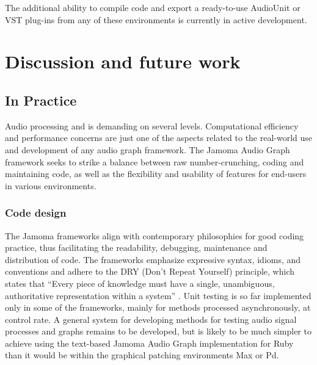 \documentclass[twoside,a4paper]{article}
\begin{document}
The additional ability to compile code and export a ready-to-use AudioUnit or VST plug-ins from any of these environments is currently in active development.





%
\section{Discussion and future work} %
%

\subsection{In Practice} %

Audio processing and is demanding on several levels.  Computational efficiency and performance concerns are just one of the aspects related to the real-world use and development of any audio graph framework.  The Jamoma Audio Graph framework seeks to strike a balance between raw number-crunching, coding and maintaining code, as well as the flexibility and usability of features for end-users in various environments.


\subsubsection{Code design} %

The Jamoma frameworks align with contemporary philosophies for good coding practice, thus facilitating the readability, debugging, maintenance and distribution of code.
The frameworks emphasize expressive syntax, idioms, and conventions \cite{Martin:2009} and adhere to the DRY (Don't Repeat Yourself) principle, which states that ``Every piece of knowledge must have a single, unambiguous, authoritative representation within a system'' \cite{Hunt:1999}.
Unit testing  \cite{Martin:2009} is so far implemented only in some of the frameworks, mainly for methods processed asynchronously, at control rate.
A general system for developing methods for testing audio signal processes and graphs remains to be developed, but is likely to be much simpler to achieve using the text-based Jamoma Audio Graph implementation for Ruby than it would be within the graphical patching environments Max or Pd.
\end{document}
